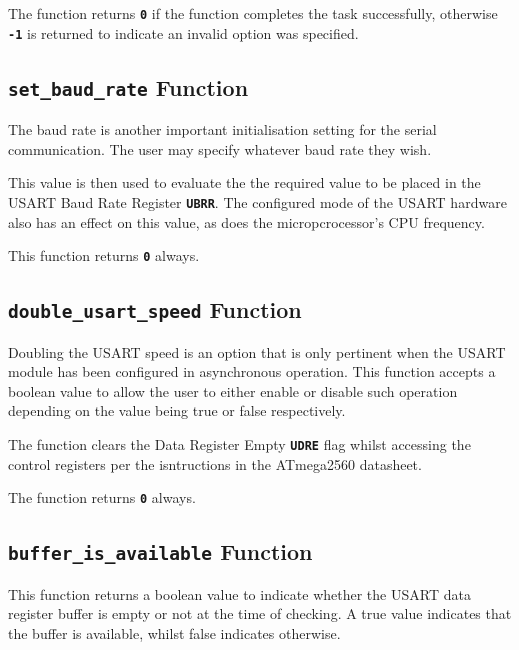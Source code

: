 \documentclass[a4paper, oneside, 11pt, titlepage, onecolumn, openright]{report}
\begin{document}
{{			The function returns \textbf{\texttt{0}} if the function completes the task successfully, otherwise \textbf{\texttt{-1}} is returned to indicate an invalid option was specified.
			
\subsection{\textbf{\texttt{set\_baud\_rate}} Function}
			\label{ss:HALusartset_baud_rateFunction}
			
			The baud rate is another important initialisation setting for the serial communication. The user may specify whatever baud rate they wish.
			
			This value is then used to evaluate the the required value to be placed in the USART Baud Rate Register \textbf{\texttt{UBRR}}. The configured mode of the USART hardware also has an effect on this value, as does the micropcrocessor's CPU frequency. 
			
			This function returns \textbf{\texttt{0}} always.

\subsection{\textbf{\texttt{double\_usart\_speed}} Function}
			\label{ss:HALusartdouble_usart_speedFunction}
			
			Doubling the USART speed is an option that is only pertinent when the USART module has been configured in asynchronous operation. This function accepts a boolean value to allow the user to either enable or disable such operation depending on the value being true or false respectively.
			
			The function clears the Data Register Empty \textbf{\texttt{UDRE}} flag whilst accessing the control registers per the isntructions in the ATmega2560 datasheet.
			
			The function returns \textbf{\texttt{0}} always.

\subsection{\textbf{\texttt{buffer\_is\_available}} Function}
			\label{ss:HALusartbuffer_is_availableFunction}
			
			This function returns a boolean value to indicate whether the USART data register buffer is empty or not at the time of checking. A true value indicates that the buffer is available, whilst false indicates otherwise.
			
}}
\end{document}
